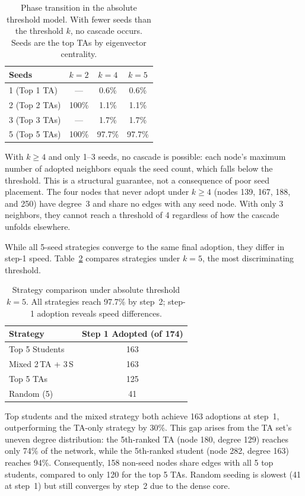 \documentclass[12pt]{article}
\begin{document}
\begin{table}[H]
\centering
\caption{Phase transition in the absolute threshold model. With fewer seeds than the threshold $k$, no cascade occurs. Seeds are the top TAs by eigenvector centrality.}
\label{tab:abs_phase}
\begin{tabular}{lccc}
\toprule
Seeds & $k = 2$ & $k = 4$ & $k = 5$ \\
\midrule
1 (Top 1 TA) & --- & 0.6\% & 0.6\% \\
2 (Top 2 TAs) & 100\% & 1.1\% & 1.1\% \\
3 (Top 3 TAs) & --- & 1.7\% & 1.7\% \\
5 (Top 5 TAs) & 100\% & 97.7\% & 97.7\% \\
\bottomrule
\end{tabular}
\end{table}

With $k \geq 4$ and only 1--3 seeds, no cascade is possible: each node's maximum number of adopted neighbors equals the seed count, which falls below the threshold. This is a structural guarantee, not a consequence of poor seed placement. The four nodes that never adopt under $k \geq 4$ (nodes 139, 167, 188, and 250) have degree~3 and share no edges with any seed node. With only 3 neighbors, they cannot reach a threshold of 4 regardless of how the cascade unfolds elsewhere.

While all 5-seed strategies converge to the same final adoption, they differ in step-1 speed. Table~\ref{tab:abs_strategy} compares strategies under $k = 5$, the most discriminating threshold.

\begin{table}[H]
\centering
\caption{Strategy comparison under absolute threshold $k = 5$. All strategies reach 97.7\% by step~2; step-1 adoption reveals speed differences.}
\label{tab:abs_strategy}
\begin{tabular}{lc}
\toprule
Strategy & Step 1 Adopted (of 174) \\
\midrule
Top 5 Students      & 163 \\
Mixed 2\,TA + 3\,S  & 163 \\
Top 5 TAs           & 125 \\
Random (5)          &  41 \\
\bottomrule
\end{tabular}
\end{table}

Top students and the mixed strategy both achieve 163 adoptions at step~1, outperforming the TA-only strategy by 30\%. This gap arises from the TA set's uneven degree distribution: the 5th-ranked TA (node 180, degree 129) reaches only 74\% of the network, while the 5th-ranked student (node 282, degree 163) reaches 94\%. Consequently, 158 non-seed nodes share edges with all 5 top students, compared to only 120 for the top 5 TAs. Random seeding is slowest (41 at step~1) but still converges by step~2 due to the dense core.
\end{document}
